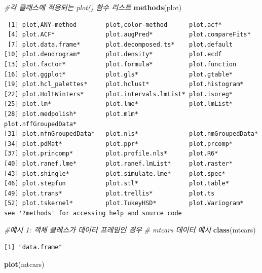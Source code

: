 \documentclass[
  11pt,
]{krantz}
\newenvironment{Shaded}{\begin{snugshade}}{\end{snugshade}}
\newcommand{\CommentTok}[1]{\textcolor[rgb]{0.37,0.37,0.37}{\textit{#1}}}
\newcommand{\KeywordTok}[1]{\textcolor[rgb]{0.27,0.27,0.27}{\textbf{#1}}}
\newcommand{\NormalTok}[1]{#1}
\begin{document}
\footnotesize

\begin{Shaded}
\begin{Highlighting}[]
\CommentTok{#각 클래스에 적용되는 plot() 함수 리스트}
\KeywordTok{methods}\NormalTok{(plot)}
\end{Highlighting}
\end{Shaded}

\begin{verbatim}
 [1] plot,ANY-method        plot,color-method      plot.acf*             
 [4] plot.ACF*              plot.augPred*          plot.compareFits*     
 [7] plot.data.frame*       plot.decomposed.ts*    plot.default          
[10] plot.dendrogram*       plot.density*          plot.ecdf             
[13] plot.factor*           plot.formula*          plot.function         
[16] plot.ggplot*           plot.gls*              plot.gtable*          
[19] plot.hcl_palettes*     plot.hclust*           plot.histogram*       
[22] plot.HoltWinters*      plot.intervals.lmList* plot.isoreg*          
[25] plot.lm*               plot.lme*              plot.lmList*          
[28] plot.medpolish*        plot.mlm*              plot.nffGroupedData*  
[31] plot.nfnGroupedData*   plot.nls*              plot.nmGroupedData*   
[34] plot.pdMat*            plot.ppr*              plot.prcomp*          
[37] plot.princomp*         plot.profile.nls*      plot.R6*              
[40] plot.ranef.lme*        plot.ranef.lmList*     plot.raster*          
[43] plot.shingle*          plot.simulate.lme*     plot.spec*            
[46] plot.stepfun           plot.stl*              plot.table*           
[49] plot.trans*            plot.trellis*          plot.ts               
[52] plot.tskernel*         plot.TukeyHSD*         plot.Variogram*       
see '?methods' for accessing help and source code
\end{verbatim}

\begin{Shaded}
\begin{Highlighting}[]
\CommentTok{#예시 1: 객체 클래스가 데이터 프레임인 경우}
\CommentTok{# mtcars 데이터 예시}
\KeywordTok{class}\NormalTok{(mtcars)}
\end{Highlighting}
\end{Shaded}

\begin{verbatim}
[1] "data.frame"
\end{verbatim}

\begin{Shaded}
\begin{Highlighting}[]
\KeywordTok{plot}\NormalTok{(mtcars)}
\end{Highlighting}
\end{Shaded}
\end{document}
